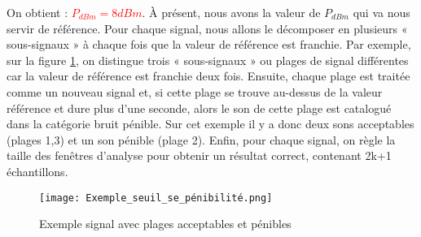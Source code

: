 On obtient : \textcolor{red}{$P_{dBm} = 8 dBm$}.
\newline\newline
À présent, nous avons la valeur de $P_{dBm}$ qui va nous servir de référence. Pour chaque signal, nous allons le décomposer en plusieurs « sous-signaux » à chaque fois que la valeur de référence est franchie. 
\newline
Par exemple, sur la figure \ref{Fig.1.2}, on distingue trois « sous-signaux » ou plages de signal différentes car la valeur de référence est franchie deux fois. Ensuite, chaque plage est traitée comme un nouveau signal et, si cette plage se trouve au-dessus de la valeur référence et dure plus d’une seconde, alors le son de cette plage est catalogué dans la catégorie bruit pénible. Sur cet exemple il y a donc deux sons acceptables (plages 1,3) et un son pénible (plage 2).
\newline
Enfin, pour chaque signal, on règle la taille des fenêtres d’analyse pour obtenir un résultat correct, contenant 2k+1 échantillons.
\begin{figure}[htb]
    \centering
    \texttt{[image: Exemple\_seuil\_se\_pénibilité.png]}
    \caption{Exemple signal avec plages acceptables et pénibles}
    \label{Fig.1.2}
\end{figure}
